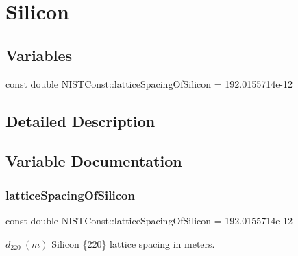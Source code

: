 \hypertarget{group___silicon}{}\section{Silicon}
\label{group___silicon}
\subsection*{Variables}
\begin{DoxyCompactItemize}
\item 
const double \hyperlink{group___silicon_ga439c53134da8a910d17c996b136da7a8}{N\+I\+S\+T\+Const\+::lattice\+Spacing\+Of\+Silicon} = 192.\+0155714e-\/12
\end{DoxyCompactItemize}


\subsection{Detailed Description}


\subsection{Variable Documentation}
\mbox{\label{group___silicon_ga439c53134da8a910d17c996b136da7a8}} 
\subsubsection{\texorpdfstring{lattice\+Spacing\+Of\+Silicon}{latticeSpacingOfSilicon}}
{\footnotesize\ttfamily const double N\+I\+S\+T\+Const\+::lattice\+Spacing\+Of\+Silicon = 192.\+0155714e-\/12}

$d_{220} \ (m)$ Silicon \{220\} lattice spacing in meters. 